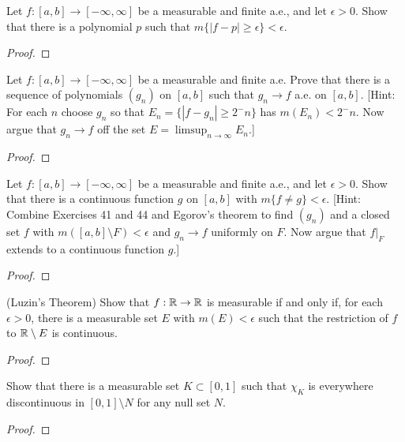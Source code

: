 \documentclass{article}
\begin{document}
 Let $f: [a,b] \to [-\infty,\infty]$ be a measurable and finite a.e., and let $\epsilon > 0$. Show that there is a polynomial $p$ such that $m\{|f - p| \ge \epsilon\} < \epsilon$.
\begin{proof} 
\end{proof}
 Let $f: [a,b] \to [-\infty,\infty]$ be a measurable and finite a.e. Prove that there is a sequence of polynomials $(g_n)$ on $[a,b]$ such that $g_n \to f$ a.e. on $[a,b]$. [Hint: For each $n$ choose $g_n$ so that $E_n = \{|f-g_n| \ge 2^-n\}$ has $m(E_n) < 2^-n$. Now argue that $g_n \to f$ off the set $E = \limsup_{n\to\infty} E_n$.]
\begin{proof}
\end{proof}
 Let $f: [a,b] \to [-\infty,\infty]$ be a measurable and finite a.e., and let $\epsilon >0$. Show that there is a continuous function $g$ on $[a,b]$ with $m\{f \ne g\} < \epsilon$. [Hint: Combine Exercises 41 and 44 and Egorov's theorem to find $(g_n)$ and a closed set $f$ with $m([a,b]\setminus F) < \epsilon$ and $g_n \to f$ uniformly on $F$. Now argue that $f|_F$ extends to a continuous function $g$.]
\begin{proof}
\end{proof}
 (Luzin's Theorem) Show that $f: \mathbb{R}\to\mathbb{R}$ is measurable if and only if, for each $\epsilon >0$, there is a measurable set $E$ with $m(E) < \epsilon$ such that the restriction of $f$ to $\mathbb{R}\setminus E$ is continuous.
\begin{proof}
\end{proof}
 Show that there is a measurable set $K \subset [0,1]$ such that $\chi_K$ is everywhere discontinuous in $[0,1] \setminus N$ for any null set $N$.
\begin{proof}
\end{proof}
\end{document}
